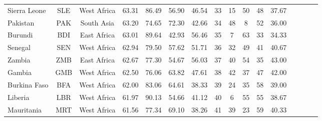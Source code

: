 \begin{longtable}[H]{lccccccccccccccc}
Sierra Leone                      & SLE           & West Africa        & 63.31       & 86.49            & 56.90                     & 46.54           & 33             & 15                  & 50                           & 48                 & 37.67                  \\
Pakistan                          & PAK           & South Asia         & 63.20       & 74.65            & 72.30                     & 42.66           & 34             & 48                  & 8                            & 52                 & 36.00                  \\
Burundi                           & BDI           & East Africa        & 63.01       & 89.64            & 42.93                     & 56.46           & 35             & 7                   & 63                           & 33                 & 34.33                  \\
Senegal                           & SEN           & West Africa        & 62.94       & 79.50            & 57.62                     & 51.71           & 36             & 32                  & 49                           & 41                 & 40.67                  \\
Zambia                            & ZMB           & East Africa        & 62.67       & 77.30            & 54.67                     & 56.03           & 37             & 40                  & 54                           & 35                 & 43.00                  \\
Gambia                            & GMB           & West Africa        & 62.50       & 76.06            & 63.82                     & 47.61           & 38             & 42                  & 37                           & 47                 & 42.00                  \\
Burkina Faso                      & BFA           & West Africa        & 62.00       & 83.06            & 64.61                     & 38.33           & 39             & 24                  & 35                           & 58                 & 39.00                  \\
Liberia                           & LBR           & West Africa        & 61.97       & 90.13            & 54.66                     & 41.12           & 40             & 6                   & 55                           & 55                 & 38.67                  \\
Mauritania                        & MRT           & West Africa        & 61.56       & 77.34            & 69.10                     & 38.26           & 41             & 39                  & 23                           & 59                 & 40.33                  \\

\end{longtable}
